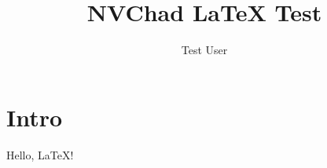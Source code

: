 \documentclass{article}
\title{NVChad LaTeX Test}
\author{Test User}
\begin{document}
\maketitle
\section{Intro}
Hello, LaTeX!\\
\lipsum[1]
\end{document}
